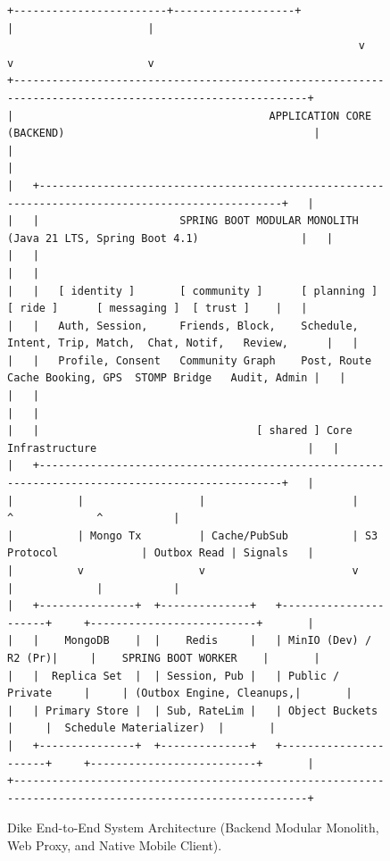 \documentclass[conference,10pt,a4paper]{IEEEtran}
\begin{document}
\begin{figure}[!t]
\begin{lstlisting}[basicstyle=\ttfamily\fontsize{6pt}{7pt}\selectfont,frame=single,numbers=none]
          +------------------------+-------------------+                 |                     |
                                                       v                 v                     v
+---------------------------------------------------------------------------------------------------------+
|                                        APPLICATION CORE (BACKEND)                                       |
|                                                                                                         |
|   +-------------------------------------------------------------------------------------------------+   |
|   |                      SPRING BOOT MODULAR MONOLITH (Java 21 LTS, Spring Boot 4.1)                |   |
|   |                                                                                                 |   |
|   |   [ identity ]       [ community ]      [ planning ]      [ ride ]      [ messaging ]  [ trust ]    |   |
|   |   Auth, Session,     Friends, Block,    Schedule, Intent, Trip, Match,  Chat, Notif,   Review,      |   |
|   |   Profile, Consent   Community Graph    Post, Route Cache Booking, GPS  STOMP Bridge   Audit, Admin |   |
|   |                                                                                                 |   |
|   |                                  [ shared ] Core Infrastructure                                 |   |
|   +-------------------------------------------------------------------------------------------------+   |
|          |                  |                       |                         ^             ^           |
|          | Mongo Tx         | Cache/PubSub          | S3 Protocol             | Outbox Read | Signals   |
|          v                  v                       v                         |             |           |
|   +---------------+  +--------------+   +----------------------+     +--------------------------+       |
|   |    MongoDB    |  |    Redis     |   | MinIO (Dev) / R2 (Pr)|     |    SPRING BOOT WORKER    |       |
|   |  Replica Set  |  | Session, Pub |   | Public / Private     |     | (Outbox Engine, Cleanups,|       |
|   | Primary Store |  | Sub, RateLim |   | Object Buckets       |     |  Schedule Materializer)  |       |
|   +---------------+  +--------------+   +----------------------+     +--------------------------+       |
+---------------------------------------------------------------------------------------------------------+
\end{lstlisting}
\caption{Dike End-to-End System Architecture (Backend Modular Monolith, Web Proxy, and Native Mobile Client).}
\label{fig:sys_arch}
\end{figure}
\end{document}
